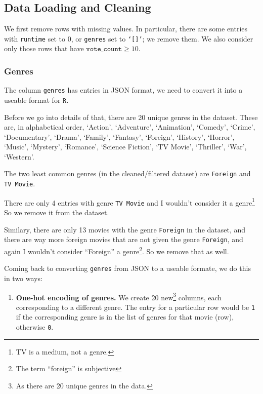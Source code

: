 \documentclass[10pt]{article}
\begin{document}
\begin{multicols}{2}
\begin{table}
\begin{center}
\end{center}
\end{table}

\subsection{Data Loading and Cleaning}

We first remove rows with missing values. In particular, there are some entries with \texttt{runtime} set to 0, or \texttt{genres} set to \texttt{`[]'}; 
we remove them. We also consider only those rows that have $\texttt{vote\_count} \ge 10$.

\subsubsection{Genres} 
The column \texttt{genres} has entries in JSON format, 
we need to convert it into a useable format for $\texttt{R}$. 

Before we go into details of that, 
there are 20 unique genres in the dataset. These are, in alphabetical order, 
`Action', `Adventure', `Animation', `Comedy', `Crime', `Documentary', 
`Drama', `Family', `Fantasy', `Foreign', `History', `Horror', 
`Music', `Mystery', `Romance', `Science Fiction', `TV Movie', 
`Thriller', `War', `Western'.

The two least common genres (in the cleaned/filtered dataset) 
are \texttt{Foreign} and \texttt{TV Movie}. 

There are only 4 entries with genre \texttt{TV Movie} 
and I wouldn't consider it a genre\footnote{TV is a medium, not a genre.} 
So we remove it from the dataset. 

Similary, there are only 13 movies with the genre \texttt{Foreign} in the dataset, 
and there are way more foreign movies that are not given the genre \texttt{Foreign}, 
and again I wouldn't consider ``Foreign'' a genre\footnote{The term ``foreign'' is subjective}. 
So we remove that as well.

Coming back to converting \texttt{genres} from JSON to a useable formate, we do this in two ways:
\begin{enumerate}
    \item \textbf{One-hot encoding of genres.} We create 20 
    new\footnote{As there are 20 unique genres in the data.} 
    columns, each corresponding to a different genre. The entry for a particular row would be 
    \texttt{1} if the corresponding genre is in the list of genres for that movie (row), 
    otherwise \texttt{0}.


\end{enumerate}
\end{multicols}
\end{document}
